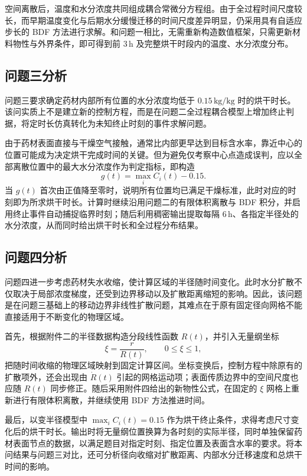 \documentclass[12pt,a4paper,fontset=none]{ctexart}
\begin{document}
空间离散后，温度和水分浓度共同组成耦合常微分方程组。由于全过程时间尺度较长，而早期温度变化与后期水分缓慢迁移的时间尺度差异明显，仍采用具有自适应步长的 BDF 方法进行求解。和问题一相比，无需重新构造数值框架，只需更新材料物性与外界条件，即可得到前 $3\,\mathrm{h}$ 及完整烘干时段内的温度、水分浓度分布。

\subsection{问题三分析}

问题三要求确定药材内部所有位置的水分浓度均低于 $0.15\,\mathrm{kg/kg}$ 时的烘干时长。该问实质上不是建立新的控制方程，而是在问题二全过程耦合模型上增加终止判据，将定时长仿真转化为未知终止时刻的事件求解问题。

由于药材表面直接与干燥空气接触，通常比内部更早达到目标含水率，靠近中心的位置可能成为决定烘干完成时间的关键。但为避免仅考察中心点造成误判，应以全部离散位置中的最大水分浓度作为判定指标，即构造
\begin{equation}
 g(t)=\max_i C_i(t)-0.15.
\end{equation}
当 $g(t)$ 首次由正值降至零时，说明所有位置均已满足干燥标准，此时对应的时刻即为所求烘干时长。计算时继续沿用问题二的有限体积离散与 BDF 积分，并启用终止事件自动捕捉临界时刻；随后利用稠密输出提取每隔 $6\,\mathrm{h}$、各指定半径处的水分浓度，从而同时给出烘干时长和全过程分布结果。

\subsection{问题四分析}

问题四进一步考虑药材失水收缩，使计算区域的半径随时间变化。此时水分扩散不仅取决于局部浓度梯度，还受到边界移动以及扩散距离缩短的影响。因此，该问题是在问题三基础上的移动边界非线性扩散问题，其难点在于原有固定径向网格不能直接适用于不断变化的物理区域。

首先，根据附件二的半径数据构造分段线性函数 $R(t)$，并引入无量纲坐标
\begin{equation}
 \xi=\frac{r}{R(t)},\qquad 0\leq \xi\leq 1,
\end{equation}
把随时间收缩的物理区域映射到固定计算区间。坐标变换后，控制方程中除原有的扩散项外，还会出现由 $\dot R(t)$ 引起的网格运动项；表面传质边界中的空间尺度也应随 $R(t)$ 同步修正。随后采用附件四给出的新物性公式，在固定的 $\xi$ 网格上重新进行有限体积离散，并继续使用 BDF 方法推进时间。

最后，以变半径模型中 $\max_i C_i(t)=0.15$ 作为烘干终止条件，求得考虑尺寸变化后的烘干时长。输出时将无量纲位置换算为各时刻的实际半径，同时单独保留药材表面节点的数据，以满足题目对指定时刻、指定位置及表面含水率的要求。将本问结果与问题三对比，还可分析径向收缩对扩散距离、内部水分迁移速度和总烘干时间的影响。
\end{document}
